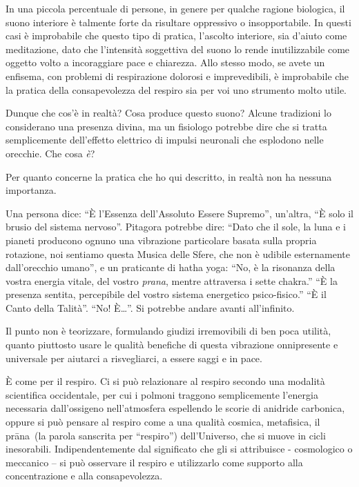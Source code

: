 In una piccola percentuale di persone, in genere per qualche ragione
biologica, il suono interiore è talmente forte da risultare oppressivo o
insopportabile. In questi casi è improbabile che questo tipo di pratica,
l'ascolto interiore, sia d'aiuto come meditazione, dato che l'intensità
soggettiva del suono lo rende inutilizzabile come oggetto volto a
incoraggiare pace e chiarezza. Allo stesso modo, se avete un enfisema,
con problemi di respirazione dolorosi e imprevedibili, è improbabile che
la pratica della consapevolezza del respiro sia per voi uno strumento
molto utile.

\smallskip

Dunque che cos'è in realtà? Cosa produce questo suono? Alcune
tradizioni lo considerano una presenza divina, ma un fisiologo potrebbe
dire che si tratta semplicemente dell'effetto elettrico di impulsi
neuronali che esplodono nelle orecchie. Che cosa \emph{è}?

Per quanto concerne la pratica che ho qui descritto, in realtà non
ha nessuna importanza.

Una persona dice: ``È l'Essenza dell'Assoluto Essere Supremo'',
un'altra, ``È solo il brusio del sistema nervoso''. Pitagora potrebbe
dire: ``Dato che il sole, la luna e i pianeti producono ognuno una
vibrazione particolare basata sulla propria rotazione, noi sentiamo
questa Musica delle Sfere, che non è udibile esternamente dall'orecchio
umano'', e un praticante di hatha yoga: ``No, è la risonanza della
vostra energia vitale, del vostro \emph{prana}, mentre attraversa i
sette chakra.'' ``È la presenza sentita, percepibile del vostro sistema
energetico psico-fisico.'' ``È il Canto della Talità''. ``No!
È\ldots{}''. Si potrebbe andare avanti all'infinito.

Il punto non è teorizzare, formulando giudizi irremovibili di ben poca
utilità, quanto piuttosto usare le qualità benefiche di questa
vibrazione onnipresente e universale per aiutarci a risvegliarci, a
essere saggi e in pace.

È come per il respiro. Ci si può relazionare al respiro secondo una
modalità scientifica occidentale, per cui i polmoni traggono
semplicemente l'energia necessaria dall'ossigeno nell'atmosfera
espellendo le scorie di anidride carbonica, oppure si può pensare al
respiro come a una qualità cosmica, metafisica, il prāna~{(la parola
sanscrita per ``respiro'') dell'Universo, che si muove in cicli
inesorabili. Indipendentemente dal significato che gli si attribuisce -
cosmologico o meccanico -- si può osservare il respiro e utilizzarlo
come supporto alla concentrazione e alla consapevolezza.}

